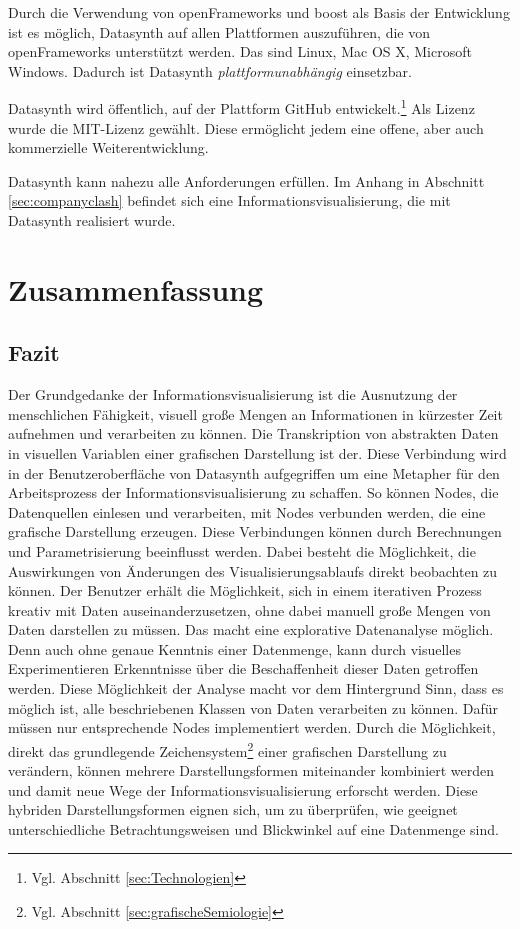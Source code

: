 \documentclass[a4paper, 
               12pt,
               DIV=calc,
               version=first,
               pdftex,
               headsepline,
               footsepline,
               bibtotocnumbered,
               liststotocnumbered]{scrreprt}
\begin{document}
Durch die Verwendung von openFrameworks und boost als Basis der Entwicklung
ist es möglich, Datasynth auf allen Plattformen auszuführen, die von openFrameworks
unterstützt werden. Das sind Linux, Mac OS X, Microsoft Windows.
Dadurch ist Datasynth \textit{plattformunabhängig} einsetzbar.

Datasynth wird öffentlich, auf der Plattform GitHub entwickelt.\footnote{Vgl.
Abschnitt \ref{sec:Technologien}} Als Lizenz wurde die MIT-Lizenz gewählt.
Diese ermöglicht jedem eine offene, aber auch kommerzielle Weiterentwicklung.

Datasynth kann nahezu alle Anforderungen erfüllen. Im Anhang in Abschnitt
\ref{sec:companyclash} befindet sich eine Informationsvisualisierung, die mit
Datasynth realisiert wurde.

\chapter{Zusammenfassung}
\label{cha:Zusammenfassung}
\section{Fazit}
\label{sec:Fazit}
Der Grundgedanke der Informationsvisualisierung ist die Ausnutzung
der menschlichen Fähigkeit, visuell große Mengen an Informationen in kürzester Zeit
aufnehmen und verarbeiten zu können.
Die Transkription von abstrakten Daten in visuellen Variablen einer
grafischen Darstellung ist der. Diese Verbindung wird in der Benutzeroberfläche
von Datasynth aufgegriffen um eine Metapher für den Arbeitsprozess der Informationsvisualisierung
zu schaffen. So können Nodes, die Datenquellen einlesen und verarbeiten, mit Nodes verbunden werden, die eine grafische
Darstellung erzeugen. Diese Verbindungen können durch Berechnungen und Parametrisierung beeinflusst werden.
Dabei besteht die Möglichkeit, die Auswirkungen von Änderungen des Visualisierungsablaufs direkt beobachten zu können.
Der Benutzer erhält die Möglichkeit, sich in einem iterativen
Prozess kreativ mit Daten auseinanderzusetzen, ohne dabei manuell
große Mengen von Daten darstellen zu müssen.
Das macht eine explorative Datenanalyse möglich.
Denn auch ohne genaue Kenntnis einer Datenmenge, kann durch visuelles Experimentieren
Erkenntnisse über die Beschaffenheit dieser Daten getroffen werden.
Diese Möglichkeit der Analyse macht vor dem Hintergrund Sinn, dass es
möglich ist, alle beschriebenen Klassen von Daten verarbeiten zu können. Dafür müssen
nur entsprechende Nodes implementiert werden.
Durch die Möglichkeit, direkt das grundlegende Zeichensystem\footnote{Vgl. Abschnitt \ref{sec:grafischeSemiologie}} einer
grafischen Darstellung zu verändern, können mehrere Darstellungsformen
miteinander kombiniert werden und damit neue Wege der Informationsvisualisierung erforscht werden.
Diese hybriden Darstellungsformen eignen sich,
um zu überprüfen, wie geeignet unterschiedliche Betrachtungsweisen und Blickwinkel auf eine Datenmenge sind.
\end{document}
